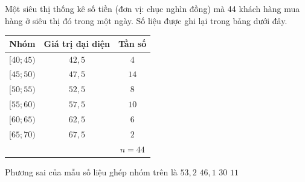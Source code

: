 \begin{ex}%
	Một siêu thị thống kê số tiền (đơn vị: chục nghìn đồng) mà 44 khách hàng mua hàng ở siêu thị đó trong một  ngày. Số liệu được ghi lại trong bảng dưới đây.
	\begin{longtable}{|c|c|c|}
		 \hline
		Nhóm & Giá trị đại  diện & Tần số\\
		\hline 
		$[40;45)$ &  $42{,}5$ & $4$\\
		 \hline
		$[45;50)$ & $47{,}5$  & $14$\\
		 \hline
		 $[50;55)$ & $52{,}5$ & $8$\\
		\hline 
		$[55;60)$ & $57{,}5$  & $10$\\
		\hline 
		$[60;65)$ & $62{,}5$ &  $6$\\
		\hline 
		$[65;70)$ & $67{,}5$ &  $2$\\
		 \hline
		 & &$n=44$\\
		 \hline
	\end{longtable}
	Phương sai của mẫu số liệu ghép nhóm  trên là
	 \choice
		 {$53{,}2$}
		 {\True $46{,}1$}
		 {$30$}
		 {$11$}
\end{ex}

